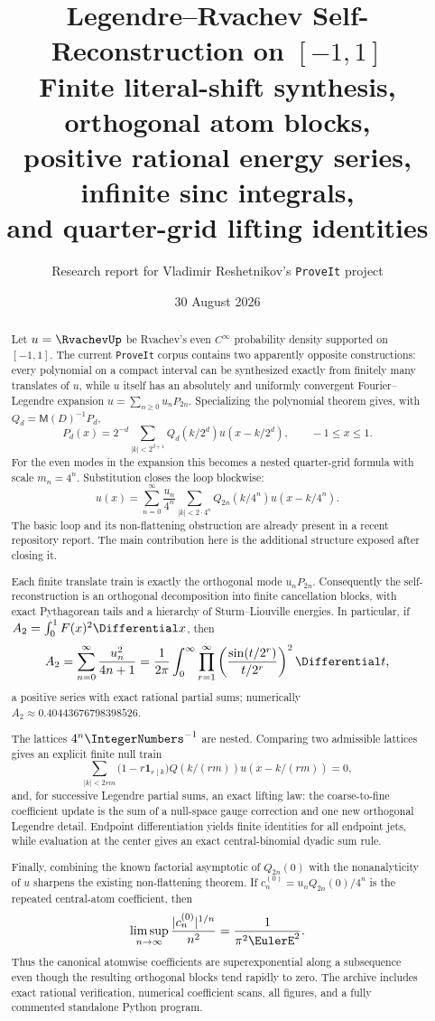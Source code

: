 \documentclass[11pt,oneside]{article}
\title{\bfseries Legendre--Rvachev Self-Reconstruction on $[-1,1]$\\[0.45em]
\large Finite literal-shift synthesis, orthogonal atom blocks,\\
positive rational energy series, infinite sinc integrals,\\
and quarter-grid lifting identities}
\author{Research report for Vladimir Reshetnikov's \texttt{ProveIt} project}
\date{30 August 2026}
\numberwithin{equation}{section}
\theoremstyle{definition}
\theoremstyle{remark}
\newcommand{\MM}{\mathsf M}
\newcommand{\one}{\mathbf 1}
\begin{document}
\maketitle

\begin{abstract}
Let $u=\RvachevUp$ be Rvachev's even $C^\infty$ probability density supported on
$[-1,1]$.  The current \texttt{ProveIt} corpus contains two apparently opposite
constructions: every polynomial on a compact interval can be synthesized
exactly from finitely many translates of $u$, while $u$ itself has an absolutely
and uniformly convergent Fourier--Legendre expansion
$u=\sum_{n\ge0}u_nP_{2n}$.  Specializing the polynomial theorem gives, with
$Q_d=\MM(D)^{-1}P_d$,
\[
 P_d(x)=2^{-d}\sum_{|k|<2^{d+1}}
 Q_d(k/2^d)u(x-k/2^d),\qquad -1\le x\le1.
\]
For the even modes in the expansion this becomes a nested quarter-grid formula
with scale $m_n=4^n$.  Substitution closes the loop blockwise:
\[
 u(x)=\sum_{n=0}^{\infty}\frac{u_n}{4^n}
 \sum_{|k|<2\cdot4^n}Q_{2n}(k/4^n)u(x-k/4^n).
\]
The basic loop and its non-flattening obstruction are already present in a
recent repository report.  The main contribution here is the additional
structure exposed after closing it.

Each finite translate train is exactly the orthogonal mode $u_nP_{2n}$.
Consequently the self-reconstruction is an orthogonal decomposition into
finite cancellation blocks, with exact Pythagorean tails and a hierarchy of
Sturm--Liouville energies.  In particular, if
$A_2=\int_0^1F(x)^2\Differential x$, then
\[
 A_2=\sum_{n=0}^{\infty}\frac{u_n^2}{4n+1}
 =\frac1{2\pi}\int_0^\infty
 \prod_{r=1}^{\infty}
 \left(\frac{\sin(t/2^r)}{t/2^r}\right)^2\Differential t,
\]
a positive series with exact rational partial sums; numerically
$A_2\approx0.40443676798398526$.

The lattices $4^n\IntegerNumbers^{-1}$ are nested.  Comparing two admissible lattices gives
an explicit finite null train
\[
 \sum_{|k|<2rm}\bigl(1-r\one_{r\mid k}\bigr)
 Q(k/(rm))u(x-k/(rm))=0,
\]
and, for successive Legendre partial sums, an exact lifting law: the
coarse-to-fine coefficient update is the sum of a null-space gauge correction
and one new orthogonal Legendre detail.  Endpoint differentiation yields
finite identities for all endpoint jets, while evaluation at the center gives
an exact central-binomial dyadic sum rule.

Finally, combining the known factorial asymptotic of $Q_{2n}(0)$ with the
nonanalyticity of $u$ sharpens the existing non-flattening theorem.  If
$c_n^{(0)}=u_nQ_{2n}(0)/4^n$ is the repeated central-atom coefficient, then
\[
 \limsup_{n\to\infty}
 \frac{|c_n^{(0)}|^{1/n}}{n^2}=\frac1{\pi^2\EulerE^2}.
\]
Thus the canonical atomwise coefficients are superexponential along a
subsequence even though the resulting orthogonal blocks tend rapidly to zero.
The archive includes exact rational verification, numerical coefficient scans,
all figures, and a fully commented standalone Python program.
\end{abstract}
\end{document}
